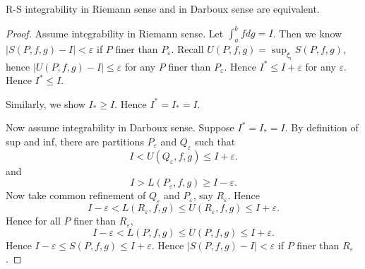 \begin{proposition}
	R-S integrability in Riemann sense and in Darboux sense are equivalent.
\end{proposition}
\begin{proof}
	Assume integrability in Riemann sense. Let $\int _a^b f dg = I$. Then we know $|S(P, f, g) - I| < \varepsilon$ if $P$ finer than $P_\varepsilon$. Recall $U(P, f, g) = \operatorname{sup}_{\xi_i} S(P, f, g)$, hence $\left| U(P, f, g) - I \right| \le \varepsilon$ for any  $P$ finer than $P_\varepsilon$. Hence $I^* \le  I + \varepsilon$ for any $\varepsilon$. Hence $I^* \le I$.

	Similarly, we show $I_* \ge I$. Hence $I^* = I_* = I$.

	Now assume integrability in Darboux sense. Suppose $I^* = I_* = I$. By definition of sup and inf, there are partitions $P_\varepsilon$ and $Q_\varepsilon$ such that 
	\[
		I < U(Q_\varepsilon, f, g) \le I + \varepsilon
	.\] 
	and \[
		I > L(P_\varepsilon, f, g) \ge I - \varepsilon
	.\] 
	Now take common refinement of  $Q_\varepsilon$ and $P_\varepsilon$, say $R_\varepsilon$. Hence
	\[
	I-\varepsilon  < L(R_\varepsilon, f, g) \le U(R_\varepsilon, f, g) \le I + \varepsilon
	.\] 
	Hence for all $P$ finer than $R_\varepsilon$,
\[
	I-\varepsilon  < L(P, f, g) \le U(P, f, g) \le I + \varepsilon
	.\]
	Hence
	$I - \varepsilon \le S(P, f, g) \le I + \varepsilon$. Hence $\left| S(P, f, g) - I \right| <\varepsilon$ if $P$ finer than $R_\varepsilon$.
\end{proof}

